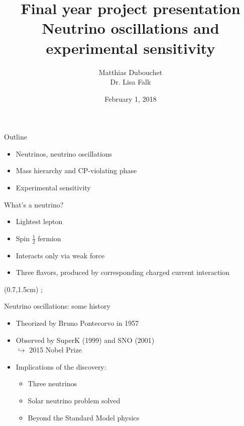 \documentclass{beamer}
\title{Final year project presentation\\Neutrino
oscillations and \\experimental sensitivity}
\author{Matthias Dubouchet\\Dr. Lisa Falk}
\date{February 1, 2018}
\begin{document}
\maketitle


\begin{frame}{Outline}

	\begin{itemize}
		\item Neutrinos, neutrino oscillations
		\item Mass hierarchy and CP-violating phase
		\item Experimental sensitivity
	\end{itemize}

\end{frame}


\begin{frame}{What's a neutrino?}

		\begin{itemize}
		\item Lightest lepton
		\item Spin $\frac{1}{2}$ fermion
		\item Interacts only via weak force
		\item Three flavors, produced by corresponding charged current interaction
		\end{itemize}

	\begin{textblock*}{0.6\textwidth}(0.7\textwidth,1.5cm)
		;
	\end{textblock*}
\end{frame}


\begin{frame}{Neutrino oscillations: some history}

		\begin{itemize}
			\item Theorized by Bruno Pontecorvo in 1957
			\item Observed by SuperK (1999) and SNO
				(2001)\\\hspace{1cm}$\hookrightarrow$ 2015 Nobel Prize
			\item Implications of the discovery:
				\begin{itemize}
					\item Three neutrinos
					\item Solar neutrino problem solved \checkmark
					\item Beyond the Standard Model physics
				\end{itemize}

		\end{itemize}

\end{frame}
\end{document}
